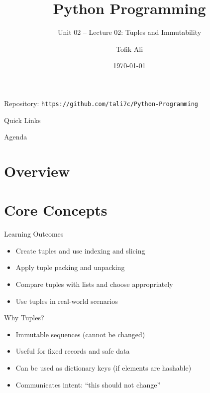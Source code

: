 \documentclass{beamer}
\title[Python Programming]{Python Programming}
\subtitle{Unit 02 -- Lecture 02: Tuples and Immutability}
\author{Tofik Ali}
\institute{School of Computer Science, UPES Dehradun}
\date{\today}
\begin{document}
\begin{frame}[fragile]
  \titlepage
  \vspace{0.5em}
  \begin{center}
  \footnotesize Repository: \texttt{https://github.com/tali7c/Python-Programming}
  \end{center}
\end{frame}

\begin{frame}[fragile]{Quick Links}
  \centering
  \hyperlink{sec:core}{}\hspace{1em}
  \hyperlink{sec:demo}{}\hspace{1em}
  \hyperlink{sec:interactive}{}\hspace{1em}
  \hyperlink{sec:summary}{}
\end{frame}

\begin{frame}[fragile]{Agenda}
  \tableofcontents
\end{frame}

\section{Overview}

\section{Core Concepts}
\label{sec:core}

\begin{frame}[fragile]{Learning Outcomes}
  \begin{itemize}[<+->]
    \item Create tuples and use indexing and slicing
    \item Apply tuple packing and unpacking
    \item Compare tuples with lists and choose appropriately
    \item Use tuples in real-world scenarios
  \end{itemize}
\end{frame}

\begin{frame}[fragile]{Why Tuples?}
  \begin{itemize}[<+->]
    \item Immutable sequences (cannot be changed)
    \item Useful for fixed records and safe data
    \item Can be used as dictionary keys (if elements are hashable)
    \item Communicates intent: ``this should not change''
  \end{itemize}
\end{frame}
\end{document}
